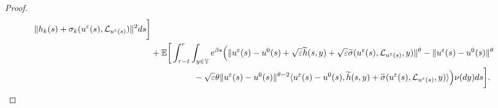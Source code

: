 \documentclass[11pt]{article}
\numberwithin{equation}{section}
\theoremstyle{plain}
\begin{document}
\begin{proof}
\begin{align}
                                     \| h_k(s) + \sigma_k(u^{\varepsilon}(s), \mathcal{L}_{u^{\varepsilon}(s)}) \|^2 ds
                  \bigg]  \nonumber\\
      & + \mathbb{E}
                    \bigg[ \int_{\tau-t}^{r} 
                                 \int_{y \in \mathbb{Y} } e^{\beta s}
                                     \Bigl( \| u^{\varepsilon}(s) - u^0(s)
	                                              + \sqrt{\varepsilon}\widetilde{h}(s, y) 
	                                              + \sqrt{\varepsilon}
	                                                        \widetilde{\sigma}
	                                                              (u^{\varepsilon}(s), \mathcal{L}_{u^{\varepsilon}(s)}, y)
	                                           \|^{\theta}
      	                                       - \| u^{\varepsilon}(s) - u^0(s) \|^{\theta}  \nonumber\\
	  & \qquad\qquad\quad
	                                           - \sqrt{ \varepsilon} \theta 
	                                                                             \| u^{\varepsilon}(s) - u^0(s) \|^{\theta - 2}
	                                           \langle u^{\varepsilon}(s) - u^0(s),
	                                                        \widetilde{h}(s,y) 
	                                                        + \widetilde{\sigma}
	                                                               (u^{\varepsilon}(s), \mathcal{L}_{u^{\varepsilon}(s)}, y)
	                                           \rangle
	                                 \Bigr) \nu(dy) ds   
	                  \bigg].
 \end{align}  
 

\end{proof}
\end{document}
